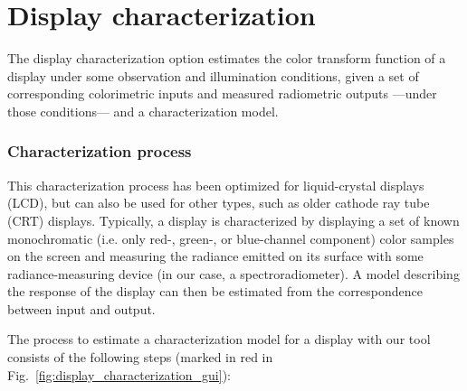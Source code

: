 \documentclass[a4paper,12pt,oneside]{article}
\begin{document}
\section{Display characterization}

The display characterization option estimates the color transform function of a display under some observation and illumination conditions, given a set of corresponding colorimetric inputs and measured radiometric outputs ---under those conditions--- and a characterization model. 

\subsubsection{Characterization process}

This characterization process has been optimized for liquid-crystal displays (LCD), but can also be used for other types, such as older cathode ray tube (CRT) displays. Typically, a display is characterized by displaying a set of known monochromatic (i.e. only red-, green-, or blue-channel component) color samples on the screen and measuring the radiance emitted on its surface with some radiance-measuring device (in our case, a spectroradiometer). A model describing the response of the display can then be estimated from the correspondence between input and output.

The process to estimate a characterization model for a display with our tool consists of the following steps (marked in red in Fig.~\ref{fig:display_characterization_gui}):
\end{document}

